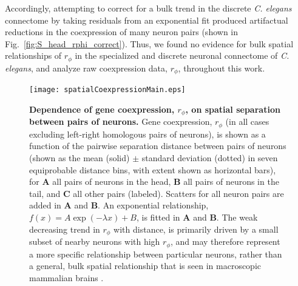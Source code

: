 \documentclass[10pt,letterpaper]{article}
\begin{document}
Accordingly, attempting to correct for a bulk trend in the discrete \emph{C. elegans} connectome by taking residuals from an exponential fit produced artifactual reductions in the coexpression of many neuron pairs (shown in Fig.~\ref{fig:S_head_rphi_correct}).
Thus, we found no evidence for bulk spatial relationships of $r_\phi$ in the specialized and discrete neuronal connectome of \emph{C. elegans}, and analyze raw coexpression data, $r_\phi$, throughout this work.

\begin{figure}[h]
  \centering
    \texttt{[image: spatialCoexpressionMain.eps]}
  \caption{
  \textbf{Dependence of gene coexpression, $r_\phi$, on spatial separation between pairs of neurons.}
  Gene coexpression, $r_\phi$ (in all cases excluding left-right homologous pairs of neurons), is shown as a function of the pairwise separation distance between pairs of neurons (shown as the mean (solid) $\pm$ standard deviation (dotted) in seven equiprobable distance bins, with extent shown as horizontal bars), for \textbf{A} all pairs of neurons in the head, \textbf{B} all pairs of neurons in the tail, and \textbf{C} all other pairs (labeled).
  Scatters for all neuron pairs are added in \textbf{A} and \textbf{B}.
  An exponential relationship, $f(x) = A\exp(-\lambda x) + B$, is fitted in \textbf{A} and \textbf{B}.
  The weak decreasing trend in $r_\phi$ with distance, is primarily driven by a small subset of nearby neurons with high $r_\phi$, and may therefore represent a more specific relationship between particular neurons, rather than a general, bulk spatial relationship that is seen in macroscopic mammalian brains \cite{Fulcher:2016ck, Krienen:2016eq}.
  }
  \label{fig:spatialCoexpressionMain}
\end{figure}
\end{document}
